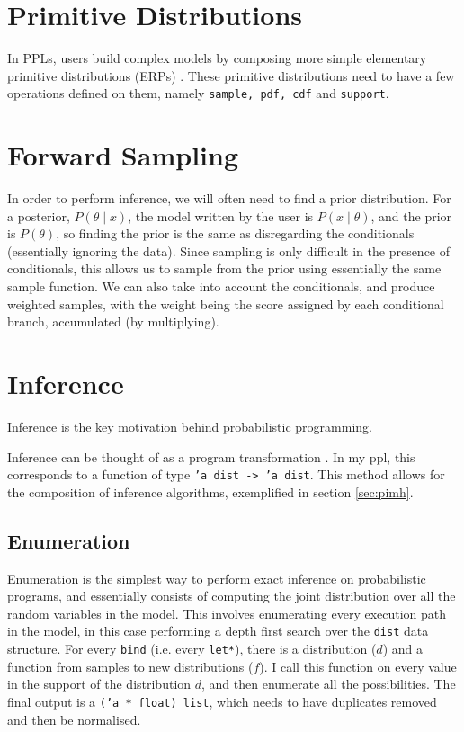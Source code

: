 \section{Primitive Distributions}
In PPLs, users build complex models by composing more simple elementary primitive distributions (ERPs) \cite{pmlr-v15-wingate11a}. These primitive distributions need to have a few operations defined on them, namely \texttt{sample, pdf, cdf} and \texttt{support}.

\section{Forward Sampling}

In order to perform inference, we will often need to find a prior distribution. For a posterior, $P(\theta\mid x)$, the model written by the user is $P(x\mid\theta)$, and the prior is $P(\theta)$, so finding the prior is the same as disregarding the conditionals (essentially ignoring the data). Since sampling is only difficult in the presence of conditionals, this allows us to sample from the prior using essentially the same sample function. We can also take into account the conditionals, and produce weighted samples, with the weight being the score assigned by each conditional branch, accumulated (by multiplying).

\section{Inference}

Inference is the key motivation behind probabilistic programming. 

Inference can be thought of as a program transformation \cite{scibior2015practical} \cite{Zinkov2016ComposingIA}. In my ppl, this corresponds to a function of type \texttt{'a dist -> 'a dist}. This method allows for the composition of inference algorithms, exemplified in section \ref{sec:pimh}.

\subsection{Enumeration} \label{sec:enum}
Enumeration is the simplest way to perform exact inference on probabilistic programs, and essentially consists of computing the joint distribution over all the random variables in the model. This involves enumerating every execution path in the model, in this case performing a depth first search over the \texttt{dist} data structure. For every \texttt{bind} (i.e. every \texttt{let*}), there is a distribution ($d$) and a function from samples to new distributions ($f$). I call this function on every value in the support of the distribution $d$, and then enumerate all the possibilities. The final output is a \texttt{('a * float) list}, which needs to have duplicates removed and then be normalised.




